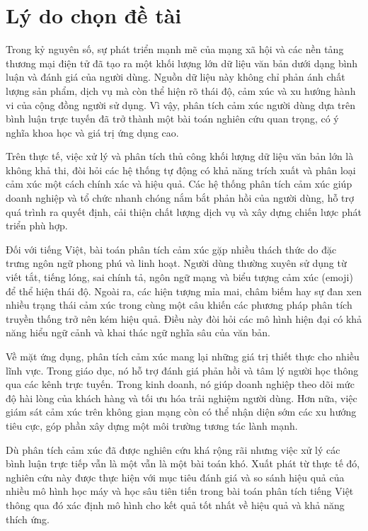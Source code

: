 \documentclass[14pt, a4paper]{report}
\begin{document}
\section{Lý do chọn đề tài}

Trong kỷ nguyên số, sự phát triển mạnh mẽ của mạng xã hội và các nền tảng thương mại điện tử đã tạo ra một khối lượng lớn dữ liệu văn bản dưới dạng bình luận và đánh giá của người dùng. Nguồn dữ liệu này không chỉ phản ánh chất lượng sản phẩm, dịch vụ mà còn thể hiện rõ thái độ, cảm xúc và xu hướng hành vi của cộng đồng người sử dụng. Vì vậy, phân tích cảm xúc người dùng dựa trên bình luận trực tuyến đã trở thành một bài toán nghiên cứu quan trọng, có ý nghĩa khoa học và giá trị ứng dụng cao.

Trên thực tế, việc xử lý và phân tích thủ công khối lượng dữ liệu văn bản lớn là không khả thi, đòi hỏi các hệ thống tự động có khả năng trích xuất và phân loại cảm xúc một cách chính xác và hiệu quả. Các hệ thống phân tích cảm xúc giúp doanh nghiệp và tổ chức nhanh chóng nắm bắt phản hồi của người dùng, hỗ trợ quá trình ra quyết định, cải thiện chất lượng dịch vụ và xây dựng chiến lược phát triển phù hợp.

Đối với tiếng Việt, bài toán phân tích cảm xúc gặp nhiều thách thức do đặc trưng ngôn ngữ phong phú và linh hoạt. Người dùng thường xuyên sử dụng từ viết tắt, tiếng lóng, sai chính tả, ngôn ngữ mạng và biểu tượng cảm xúc (emoji) để thể hiện thái độ. Ngoài ra, các hiện tượng mỉa mai, châm biếm hay sự đan xen nhiều trạng thái cảm xúc trong cùng một câu khiến các phương pháp phân tích truyền thống trở nên kém hiệu quả. Điều này đòi hỏi các mô hình hiện đại có khả năng hiểu ngữ cảnh và khai thác ngữ nghĩa sâu của văn bản.

Về mặt ứng dụng, phân tích cảm xúc mang lại những giá trị thiết thực cho nhiều lĩnh vực. Trong giáo dục, nó hỗ trợ đánh giá phản hồi và tâm lý người học thông qua các kênh trực tuyến. Trong kinh doanh, nó giúp doanh nghiệp theo dõi mức độ hài lòng của khách hàng và tối ưu hóa trải nghiệm người dùng. Hơn nữa, việc giám sát cảm xúc trên không gian mạng còn có thể nhận diện sớm các xu hướng tiêu cực, góp phần xây dựng một môi trường tương tác lành mạnh.

Dù phân tích cảm xúc đã được nghiên cứu khá rộng rãi nhưng việc xử lý các bình luận trực tiếp vẫn là một vẫn là một bài toán khó. Xuất phát từ thực tế đó, nghiên cứu này được thực hiện với mục tiêu đánh giá và so sánh hiệu quả của nhiều mô hình học máy và học sâu tiên tiến trong bài toán phân tích tiếng Việt thông qua đó xác định mô hình cho kết quả tốt nhất về hiệu quả và khả năng thích ứng.
\end{document}
